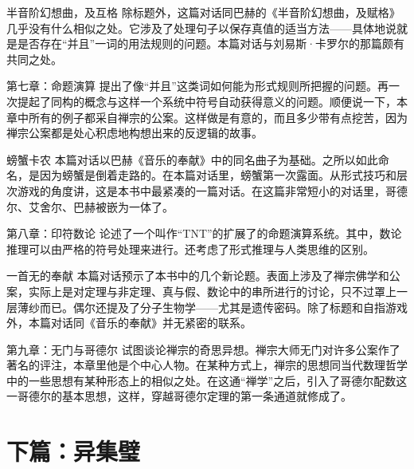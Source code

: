 \begin{overview}
\item[半音阶幻想曲，及互格]除标题外，这篇对话同巴赫的《半音阶幻想曲，及赋格》几乎没有什么相似之处。它涉及了处理句子以保存真值的适当方法——具体地说就是是否存在“并且”一词的用法规则的问题。本篇对话与刘易斯·卡罗尔的那篇颇有共同之处。

\item[第七章：命题演算]提出了像“并且”这类词如何能为形式规则所把握的问题。再一次提起了同构的概念与这样一个系统中符号自动获得意义的问题。顺便说一下，本章中所有的例子都采自禅宗的公案。这样做是有意的，而且多少带有点挖苦，因为禅宗公案都是处心积虑地构想出来的反逻辑的故事。

\item[螃蟹卡农]本篇对话以巴赫《音乐的奉献》中的同名曲子为基础。之所以如此命名，是因为螃蟹是倒着走路的。在本篇对话里，螃蟹第一次露面。从形式技巧和层次游戏的角度讲，这是本书中最紧凑的一篇对话。在这篇非常短小的对话里，哥德尔、艾舍尔、巴赫被嵌为一体了。

\item[第八章：印符数论]论述了一个叫作“TNT”的扩展了的命题演算系统。其中，数论推理可以由严格的符号处理来进行。还考虑了形式推理与人类思维的区别。

\item[一首无的奉献]本篇对话预示了本书中的几个新论题。表面上涉及了禅宗佛学和公案，实际上是对定理与非定理、真与假、数论中的串所进行的讨论，只不过罩上一层薄纱而已。偶尔还提及了分子生物学——尤其是遗传密码。除了标题和自指游戏外，本篇对话同《音乐的奉献》并无紧密的联系。

\item[第九章：无门与哥德尔]试图谈论禅宗的奇思异想。禅宗大师无门对许多公案作了著名的评注，本章里他是个中心人物。在某种方式上，禅宗的思想同当代数理哲学中的一些思想有某种形态上的相似之处。在这通“禅学”之后，引入了哥德尔配数这一哥德尔的基本思想，这样，穿越哥德尔定理的第一条通道就修成了。

\end{overview}

\section*{下篇：异集璧}

